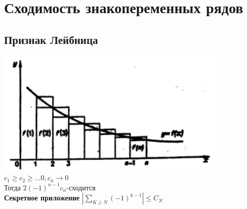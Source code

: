 \documentclass[12pt, a4paper]{article}
\begin{document}
         \section{Сходимость  знакопеременных рядов}
         
         \subsection{Признак Лейбница}
        \includegraphics{leidn.png}
         $ c_1 \geq c_2 \geq \dots 0 , c_n \rightarrow 0 $\\
         Тогда $ 2(-1)^{n-1}c_n $-сходится\\ 
         \textbf{Секретное приложение}
         $ |\sum_{K \geq N}(-1)^{k-1}| \leq C_N $\\
         
\end{document}
